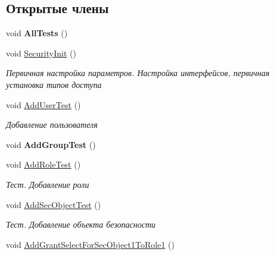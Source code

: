 \subsection*{Открытые члены}
\begin{DoxyCompactItemize}
\item 
\mbox{\label{class_security_1_1_tests_1_1_tests_1_1_fake_security_work_unit_test_a7beb38193a1889727dfc9bda8be4d9a4}} 
void {\bfseries All\+Tests} ()
\item 
void \hyperlink{class_security_1_1_tests_1_1_tests_1_1_fake_security_work_unit_test_ab6d881ce39c896f7cc73eaa6946f3132}{Security\+Init} ()
\begin{DoxyCompactList}\small\item\em Первичная настройка параметров. Настройка интерфейсов, первичная установка типов доступа \end{DoxyCompactList}\item 
void \hyperlink{class_security_1_1_tests_1_1_tests_1_1_fake_security_work_unit_test_a3108e9b07d660d28e7c058404afdcfaf}{Add\+User\+Test} ()
\begin{DoxyCompactList}\small\item\em Добавление пользователя \end{DoxyCompactList}\item 
\mbox{\label{class_security_1_1_tests_1_1_tests_1_1_fake_security_work_unit_test_a6ee3c9ac2df1178bf46c0074dbd902d9}} 
void {\bfseries Add\+Group\+Test} ()
\item 
void \hyperlink{class_security_1_1_tests_1_1_tests_1_1_fake_security_work_unit_test_a51e77ba4742245022e44a66d1755810e}{Add\+Role\+Test} ()
\begin{DoxyCompactList}\small\item\em Тест. Добавление роли \end{DoxyCompactList}\item 
void \hyperlink{class_security_1_1_tests_1_1_tests_1_1_fake_security_work_unit_test_aa317c78b205ff105abe10472c39a29d0}{Add\+Sec\+Object\+Test} ()
\begin{DoxyCompactList}\small\item\em Тест. Добавление объекта безопасности \end{DoxyCompactList}\item 
void \hyperlink{class_security_1_1_tests_1_1_tests_1_1_fake_security_work_unit_test_a658ca28eba33432fbe04e2f708ac1eff}{Add\+Grant\+Select\+For\+Sec\+Object1\+To\+Role1} ()

\end{DoxyCompactItemize}
